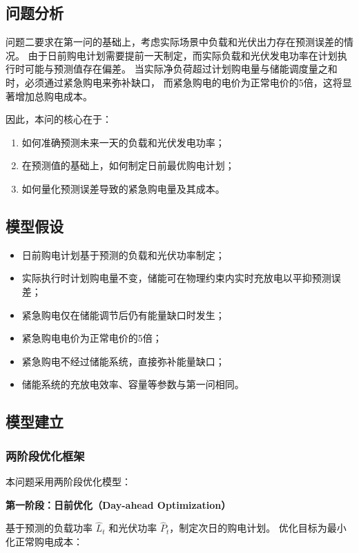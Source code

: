 \documentclass[12pt,a4paper]{article}
\begin{document}
\subsection{问题分析}

问题二要求在第一问的基础上，考虑实际场景中负载和光伏出力存在预测误差的情况。
由于日前购电计划需要提前一天制定，而实际负载和光伏发电功率在计划执行时可能与预测值存在偏差。
当实际净负荷超过计划购电量与储能调度量之和时，必须通过紧急购电来弥补缺口，
而紧急购电的电价为正常电价的5倍，这将显著增加总购电成本。

因此，本问的核心在于：
\begin{enumerate}
    \item 如何准确预测未来一天的负载和光伏发电功率；
    \item 在预测值的基础上，如何制定日前最优购电计划；
    \item 如何量化预测误差导致的紧急购电量及其成本。
\end{enumerate}

\subsection{模型假设}

\begin{itemize}
    \item 日前购电计划基于预测的负载和光伏功率制定；
    \item 实际执行时计划购电量不变，储能可在物理约束内实时充放电以平抑预测误差；
    \item 紧急购电仅在储能调节后仍有能量缺口时发生；
    \item 紧急购电电价为正常电价的5倍；
    \item 紧急购电不经过储能系统，直接弥补能量缺口；
    \item 储能系统的充放电效率、容量等参数与第一问相同。
\end{itemize}

\subsection{模型建立}

\subsubsection{两阶段优化框架}

本问题采用两阶段优化模型：

\textbf{第一阶段：日前优化（Day-ahead Optimization）}

基于预测的负载功率 $\hat{L}_t$ 和光伏功率 $\hat{P}_t$，制定次日的购电计划。
优化目标为最小化正常购电成本：
\end{document}
